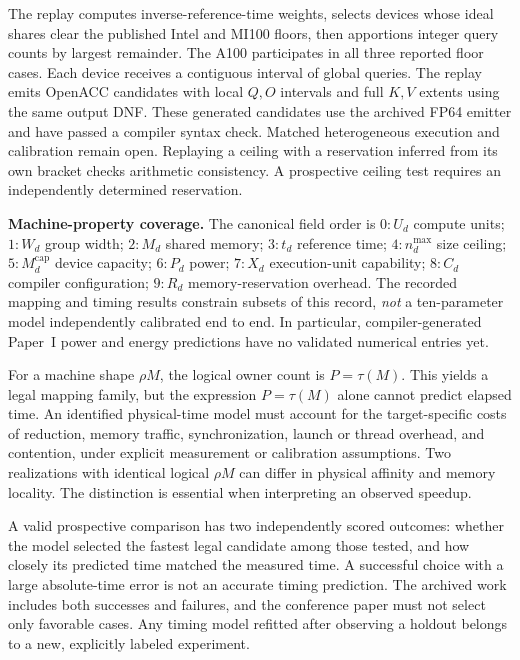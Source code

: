\documentclass[sigplan,10pt,review,balance=false,pbalance=false]{acmart}
\begin{document}
The replay computes inverse-reference-time weights, selects devices whose ideal shares clear the published Intel and MI100 floors, then apportions integer query counts by largest remainder. The A100 participates in all three reported floor cases. Each device receives a contiguous interval of global queries. The replay emits OpenACC candidates with local $Q,O$ intervals and full $K,V$ extents using the same output DNF. These generated candidates use the archived FP64 emitter and have passed a compiler syntax check. Matched heterogeneous execution and calibration remain open. Replaying a ceiling with a reservation inferred from its own bracket checks arithmetic consistency. A prospective ceiling test requires an independently determined reservation.

\noindent\textbf{Machine-property coverage.} The canonical field order is $0:U_d$ compute units; $1:W_d$ group width; $2:M_d$ shared memory; $3:t_d$ reference time; $4:n_d^{\max}$ size ceiling; $5:M_d^{\mathrm{cap}}$ device capacity; $6:P_d$ power; $7:X_d$ execution-unit capability; $8:C_d$ compiler configuration; $9:R_d$ memory-reservation overhead. The recorded mapping and timing results constrain subsets of this record, \emph{not} a ten-parameter model independently calibrated end to end. In particular, compiler-generated Paper~I power and energy predictions have no validated numerical entries yet.


For a machine shape $\rho M$, the logical owner count is $P=\tau(M)$. This yields a legal mapping family, but the expression $P=\tau(M)$ alone cannot predict elapsed time. An identified physical-time model must account for the target-specific costs of reduction, memory traffic, synchronization, launch or thread overhead, and contention, under explicit measurement or calibration assumptions. Two realizations with identical logical $\rho M$ can differ in physical affinity and memory locality. The distinction is essential when interpreting an observed speedup.

A valid prospective comparison has two independently scored outcomes: whether the model selected the fastest legal candidate among those tested, and how closely its predicted time matched the measured time. A successful choice with a large absolute-time error is not an accurate timing prediction. The archived work includes both successes and failures, and the conference paper must not select only favorable cases. Any timing model refitted after observing a holdout belongs to a new, explicitly labeled experiment.
\end{document}
